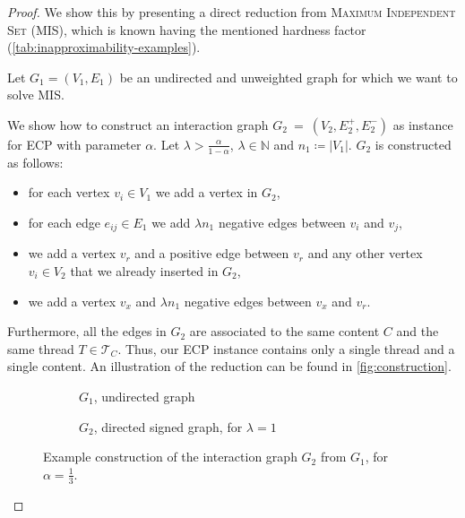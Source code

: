 \begin{proof}
	We show this by presenting a direct reduction from \textsc{Maximum
		Independent Set} (MIS), which is known having the mentioned hardness
	factor (\autoref{tab:inapproximability-examples}).

	\bigskip
	Let $G_{1}  = (V_{1} ,E_{1} )$ be an undirected and unweighted graph for
	which we want to solve MIS.

	We show how to construct an interaction graph \mbox{${G}_{2}~=~(V_{2} , E^{+}_{2} , E
				^{-}_{2} ) $} as instance for \acrshort{ECP} with parameter
	$\alpha $. Let $\lambda > \frac{\alpha }{1 - \alpha }$, $\lambda \in \mathbb{N} $ and $n_{1} \coloneqq |V_{1}| $.
	$G_2$ is constructed as follows:

	\begin{itemize}
		\item for each vertex $v_{i}  \in V_{1} $ we add a vertex in $G_{2} $,
		\item for each edge $e_{ij}  \in
			      E_{1} $ we add $\lambda n_{1} $ negative edges between $v_{i}
		      $ and $v_{j} $,
		\item we add a vertex $v_r$ and a positive edge between $v_r$ and any other
		      vertex $v_i \in V_2$ that we already inserted in $G_2$,
		\item we add a vertex $v_x$ and $\lambda n_{1} $ negative edges between $v_x$
		      and $v_{r} $.
	\end{itemize}

	Furthermore, all the edges in $G_{2} $ are associated to the same content
	$C$ and the same thread $T \in \mathcal{T}_{C}  $.
	Thus, our \acrshort{ECP} instance contains only a single thread and a
	single content.  An illustration of the reduction can be found in \autoref{fig:construction}.

	\begin{figure}
		\begin{center}
			\begin{subfigure}{0.4\textwidth}
				\centering
				\vspace{10pt}
				\caption{$G_{1}$, undirected graph}
				\label{fig:g1_example}
			\end{subfigure}
			\begin{subfigure}{0.4\textwidth}
				\centering
				\caption{$G_{2}$, directed signed graph, for $\lambda = 1$}
				\label{fig:g2_example}
			\end{subfigure}
		\end{center}
		\caption[Example reduction from MIS to \acrshort{ECP}]{Example construction of the interaction graph $G_{2} $ from
			$G_{1} $, for $\alpha = \frac{1}{3} $.}
		\label{fig:construction}
	\end{figure}


\end{proof}
